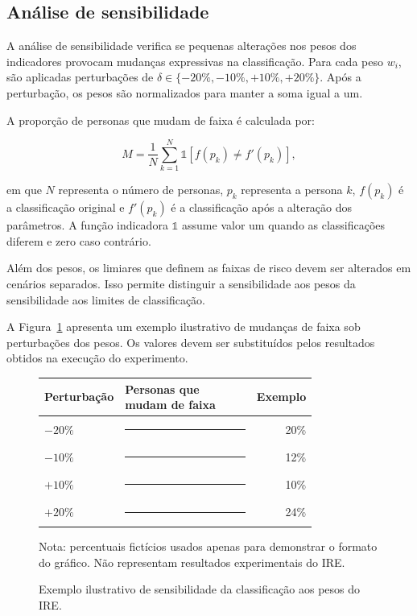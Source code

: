 \documentclass[portuguese]{sbc2025}%
\begin{document}
\subsection{Análise de sensibilidade}
\label{sec:aval-sensibilidade}

A análise de sensibilidade verifica se pequenas alterações nos pesos
dos indicadores provocam mudanças expressivas na classificação. Para
cada peso $w_i$, são aplicadas perturbações de
$\delta \in \{-20\%, -10\%, +10\%, +20\%\}$. Após a perturbação, os
pesos são normalizados para manter a soma igual a um.

A proporção de personas que mudam de faixa é calculada por:

\begin{equation}
M = \frac{1}{N}\sum_{k=1}^{N}
\mathbb{1}\left[f(p_k) \neq f'(p_k)\right],
\label{eq:mudanca-faixa}
\end{equation}

em que $N$ representa o número de personas, $p_k$ representa a
persona $k$, $f(p_k)$ é a classificação original e $f'(p_k)$ é a
classificação após a alteração dos parâmetros. A função indicadora
$\mathbb{1}$ assume valor um quando as classificações diferem e zero
caso contrário.

Além dos pesos, os limiares que definem as faixas de risco devem ser
alterados em cenários separados. Isso permite distinguir a sensibilidade
aos pesos da sensibilidade aos limites de classificação.

A Figura~\ref{fig:sens} apresenta um exemplo ilustrativo de mudanças
de faixa sob perturbações dos pesos. Os valores devem ser substituídos
pelos resultados obtidos na execução do experimento.


\begin{figure}[htbp]
\centering
\small
\caption{Exemplo ilustrativo de sensibilidade da classificação aos pesos do IRE.}
\label{fig:sens}
\begin{tabular}{@{}p{0.22\linewidth}p{0.58\linewidth}r@{}}
\toprule
\textbf{Perturbação} & \textbf{Personas que mudam de faixa} & \textbf{Exemplo} \\
\midrule
$-20\%$ & \rule{32mm}{5pt} & 20\% \\
$-10\%$ & \rule{19mm}{5pt} & 12\% \\
$+10\%$ & \rule{16mm}{5pt} & 10\% \\
$+20\%$ & \rule{38mm}{5pt} & 24\% \\
\bottomrule
\end{tabular}

\vspace{2mm}
\parbox{0.92\linewidth}{\footnotesize
Nota: percentuais fictícios usados apenas para demonstrar o formato
do gráfico. Não representam resultados experimentais do IRE.}
\end{figure}
\end{document}
